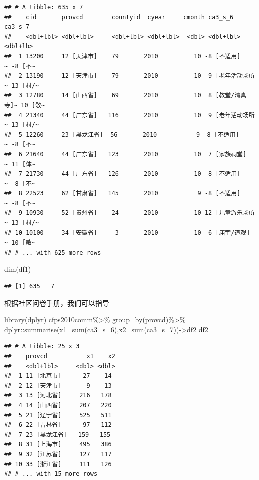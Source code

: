 \documentclass[
  oneside]{book}
\newenvironment{Shaded}{\begin{snugshade}}{\end{snugshade}}
\newcommand{\AttributeTok}[1]{\textcolor[rgb]{0.77,0.63,0.00}{#1}}
\newcommand{\FunctionTok}[1]{\textcolor[rgb]{0.00,0.00,0.00}{#1}}
\newcommand{\NormalTok}[1]{#1}
\newcommand{\OtherTok}[1]{\textcolor[rgb]{0.56,0.35,0.01}{#1}}
\newcommand{\SpecialCharTok}[1]{\textcolor[rgb]{0.00,0.00,0.00}{#1}}
\begin{document}
\begin{verbatim}
## # A tibble: 635 x 7
##    cid       provcd        countyid  cyear     cmonth ca3_s_6           ca3_s_7 
##    <dbl+lbl> <dbl+lbl>     <dbl+lbl> <dbl+lbl>  <dbl> <dbl+lbl>         <dbl+lb>
##  1 13200     12 [天津市]    79       2010          10 -8 [不适用]     ~ -8 [不~
##  2 13190     12 [天津市]    79       2010          10  9 [老年活动场所~ 13 [村/~
##  3 12780     14 [山西省]    69       2010          10  8 [教堂/清真寺]~ 10 [敬~
##  4 21340     44 [广东省]   116       2010          10  9 [老年活动场所~ 13 [村/~
##  5 12260     23 [黑龙江省]  56       2010           9 -8 [不适用]     ~ -8 [不~
##  6 21640     44 [广东省]   123       2010          10  7 [家族祠堂]   ~ 11 [体~
##  7 21730     44 [广东省]   126       2010          10 -8 [不适用]     ~ -8 [不~
##  8 22523     62 [甘肃省]   145       2010           9 -8 [不适用]     ~ -8 [不~
##  9 10930     52 [贵州省]    24       2010          10 12 [儿童游乐场所~ 13 [村/~
## 10 10100     34 [安徽省]     3       2010          10  6 [庙宇/道观]  ~ 10 [敬~
## # ... with 625 more rows
\end{verbatim}

\begin{Shaded}
\begin{Highlighting}[]
\FunctionTok{dim}\NormalTok{(df1)}
\end{Highlighting}
\end{Shaded}

\begin{verbatim}
## [1] 635   7
\end{verbatim}

根据社区问卷手册，我们可以指导

\begin{Shaded}
\begin{Highlighting}[]
\FunctionTok{library}\NormalTok{(dplyr)}
\NormalTok{cfps2010comm}\SpecialCharTok{\%\textgreater{}\%}
  \FunctionTok{group\_by}\NormalTok{(provcd)}\SpecialCharTok{\%\textgreater{}\%}
\NormalTok{  dplyr}\SpecialCharTok{::}\FunctionTok{summarise}\NormalTok{(}\AttributeTok{x1=}\FunctionTok{sum}\NormalTok{(ca3\_s\_6),}\AttributeTok{x2=}\FunctionTok{sum}\NormalTok{(ca3\_s\_7))}\OtherTok{{-}\textgreater{}}\NormalTok{df2}
\NormalTok{df2}
\end{Highlighting}
\end{Shaded}

\begin{verbatim}
## # A tibble: 25 x 3
##    provcd           x1    x2
##    <dbl+lbl>     <dbl> <dbl>
##  1 11 [北京市]      27    14
##  2 12 [天津市]       9    13
##  3 13 [河北省]     216   178
##  4 14 [山西省]     207   220
##  5 21 [辽宁省]     525   511
##  6 22 [吉林省]      97   112
##  7 23 [黑龙江省]   159   155
##  8 31 [上海市]     495   386
##  9 32 [江苏省]     127   117
## 10 33 [浙江省]     111   126
## # ... with 15 more rows
\end{verbatim}
\end{document}
